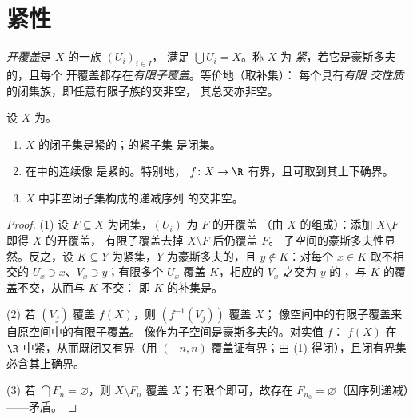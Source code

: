 \section{紧性}

\begin{definition}\label{def:b3:topology:compact}
\emph{开覆盖}是 $X$ 的一族 $(U_i)_{i\in I}$，
满足 $\bigcup U_i = X$。称 $X$ 为
\emph{紧}，若它是豪斯多夫的，且每个
开覆盖都存在\emph{有限子覆盖}。等价地（取补集）：
每个具有\emph{有限
交性质}的闭集族，即任意有限子族的交非空，
其总交亦非空。
\end{definition}

\begin{theorem}[基本性质]\label{thm:b3:topology:compactprops}
设 $X$ 为。
\begin{enumerate}
  \item $X$ 的闭子集是紧的；的紧子集
        是闭集。
  \item {}在中的连续像
        是紧的。特别地， $f\colon X
        \to \R$ 有界，且可取到其上下确界。
  \item $X$ 中非空闭子集构成的递减序列
        的交非空。
\end{enumerate}
\end{theorem}

\begin{proof}
(1) 设 $F \subseteq X$ 为闭集，$(U_i)$ 为 $F$ 的开覆盖
（由 $X$ 的组成）：添加 $X \setminus F$ 即得 $X$ 的开覆盖，
有限子覆盖去掉 $X \setminus F$ 后仍覆盖 $F$。
子空间的豪斯多夫性显然。反之，设 $K \subseteq Y$
为紧集，$Y$ 为豪斯多夫的，且 $y \notin K$：对每个 $x \in K$
取不相交的 $U_x \ni x$、$V_x \ni y$；有限多个 $U_x$
覆盖 $K$，相应的 $V_x$ 之交为 $y$ 的
，与 $K$ 的覆盖不交，从而与 $K$ 不交：
即 $K$ 的补集是。

(2) 若 $(V_j)$ 覆盖 $f(X)$，则 $(f^{-1}(V_j))$ 覆盖 $X$；
像空间中的有限子覆盖来自原空间中的有限子覆盖。
像作为子空间是豪斯多夫的。对实值 $f$：
$f(X)$ 在 $\R$ 中紧，从而既闭又有界（用
$(-n, n)$ 覆盖证有界；由 (1) 得闭），且闭有界集
必含其上确界。

(3) 若 $\bigcap F_n = \varnothing$，则 $X \setminus F_n$
覆盖 $X$；有限个即可，故存在 $F_{n_0} =
\varnothing$（因序列递减）——矛盾。
\end{proof}

